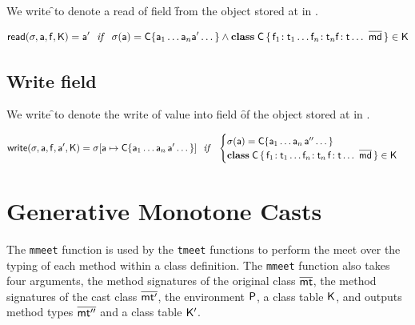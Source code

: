 \documentclass[a4paper,USenglish]{tex/lipics-v2016}
\begin{document}
We write \readf\s\a\f\K to denote a read of field \f from the object
stored at \a in \s.

\begin{equation*}
\readf \s\a\f\K = \ap ~~\mathit{if}~~  \s(\a) = \obj\C{\a_1\dots\a_n \ap \dots} \AND
 \Class\C {\Fdef{\f_1}{\t_1}\dots\Fdef{\f_n}{\t_n}\Ftype\f\t\dots}{\b\md}\in\K
\end{equation*}

\subsection{Write field}

We write \setf\s\a\f\ap\K to denote the write of value \ap into field \f of
the object stored at \a in \s.

\begin{equation*}
\setf \s\a\f\ap\K= \Map\s{\Bind{\a}{\obj\C{\a_1\dots\a_n\,\ap\dots}}}
  ~~\mathit{if}~~ \begin{cases}
   \s(\a) = \obj\C{\a_1\dots\a_n\,\app\dots}\\
   \Class\C{\Fdef{\f_1}{\t_1}\dots\Fdef{\f_n}{\t_n}\,\Fdef\f\t\dots}{\b\md}\in\K
\end{cases}
\end{equation*}

\section{Generative Monotone Casts}

The \texttt{mmeet} function is used by the \texttt{tmeet} functions to
perform the meet over the typing of each method within a class definition.
The \texttt{mmeet} function also takes four arguments, the method
signatures of the original class $\b\mt$, the method signatures of the cast
class $\b\mtp$, the environment $\P$, a class table $\K$, and outputs method
types $\b\mtpp$ and a class table $\Kp$. 

\hrulefill
\end{document}

